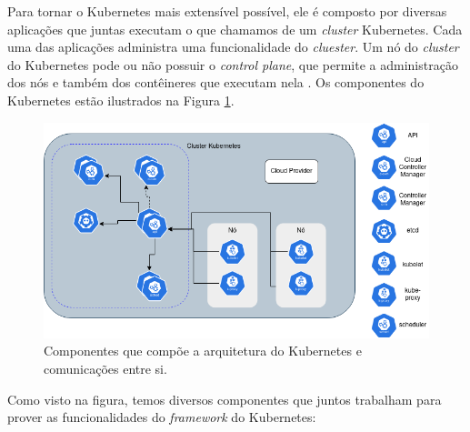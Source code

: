 Para tornar o Kubernetes mais extensível possível, ele é composto por diversas
aplicações que juntas executam o que chamamos de um \textit{cluster} Kubernetes.
Cada uma das aplicações administra uma funcionalidade do \textit{cluester}.
Um nó do \textit{cluster} do Kubernetes pode ou não possuir o \textit{control plane},
que permite a administração dos nós e também dos contêineres que executam nela
\cite{kubernetes:components}. Os componentes do Kubernetes estão ilustrados na
Figura \ref{fig:kubernetes:components}.

\begin{figure}[h]
\centering
\includegraphics[scale=0.54]{images/kubernetes-components.png}
\caption{Componentes que compõe a arquitetura do Kubernetes e comunicações entre si.}
\label{fig:kubernetes:components}
\end{figure}

Como visto na figura, temos diversos componentes que juntos trabalham para
prover as funcionalidades do \textit{framework} do Kubernetes:

